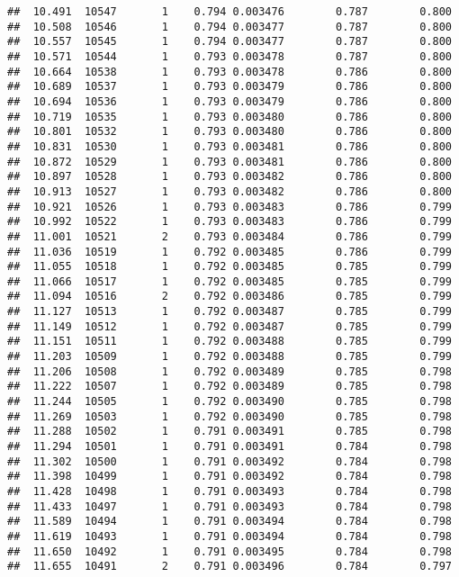 \documentclass[
]{book}
\begin{document}
\begin{verbatim}
##  10.491  10547       1    0.794 0.003476        0.787        0.800
##  10.508  10546       1    0.794 0.003477        0.787        0.800
##  10.557  10545       1    0.794 0.003477        0.787        0.800
##  10.571  10544       1    0.793 0.003478        0.787        0.800
##  10.664  10538       1    0.793 0.003478        0.786        0.800
##  10.689  10537       1    0.793 0.003479        0.786        0.800
##  10.694  10536       1    0.793 0.003479        0.786        0.800
##  10.719  10535       1    0.793 0.003480        0.786        0.800
##  10.801  10532       1    0.793 0.003480        0.786        0.800
##  10.831  10530       1    0.793 0.003481        0.786        0.800
##  10.872  10529       1    0.793 0.003481        0.786        0.800
##  10.897  10528       1    0.793 0.003482        0.786        0.800
##  10.913  10527       1    0.793 0.003482        0.786        0.800
##  10.921  10526       1    0.793 0.003483        0.786        0.799
##  10.992  10522       1    0.793 0.003483        0.786        0.799
##  11.001  10521       2    0.793 0.003484        0.786        0.799
##  11.036  10519       1    0.792 0.003485        0.786        0.799
##  11.055  10518       1    0.792 0.003485        0.785        0.799
##  11.066  10517       1    0.792 0.003485        0.785        0.799
##  11.094  10516       2    0.792 0.003486        0.785        0.799
##  11.127  10513       1    0.792 0.003487        0.785        0.799
##  11.149  10512       1    0.792 0.003487        0.785        0.799
##  11.151  10511       1    0.792 0.003488        0.785        0.799
##  11.203  10509       1    0.792 0.003488        0.785        0.799
##  11.206  10508       1    0.792 0.003489        0.785        0.798
##  11.222  10507       1    0.792 0.003489        0.785        0.798
##  11.244  10505       1    0.792 0.003490        0.785        0.798
##  11.269  10503       1    0.792 0.003490        0.785        0.798
##  11.288  10502       1    0.791 0.003491        0.785        0.798
##  11.294  10501       1    0.791 0.003491        0.784        0.798
##  11.302  10500       1    0.791 0.003492        0.784        0.798
##  11.398  10499       1    0.791 0.003492        0.784        0.798
##  11.428  10498       1    0.791 0.003493        0.784        0.798
##  11.433  10497       1    0.791 0.003493        0.784        0.798
##  11.589  10494       1    0.791 0.003494        0.784        0.798
##  11.619  10493       1    0.791 0.003494        0.784        0.798
##  11.650  10492       1    0.791 0.003495        0.784        0.798
##  11.655  10491       2    0.791 0.003496        0.784        0.797

\end{verbatim}
\end{document}
